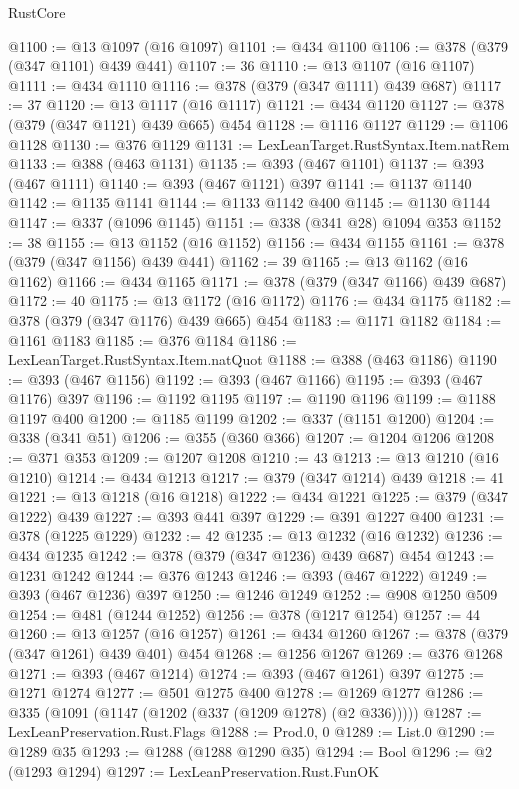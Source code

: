 \begin{lexlean}{RustCore}
\begin{coremodule}
@1100 := @13 @1097 (@16 @1097)
@1101 := @434 @1100
@1106 := @378 (@379 (@347 @1101) @439 @441)
@1107 := 36
@1110 := @13 @1107 (@16 @1107)
@1111 := @434 @1110
@1116 := @378 (@379 (@347 @1111) @439 @687)
@1117 := 37
@1120 := @13 @1117 (@16 @1117)
@1121 := @434 @1120
@1127 := @378 (@379 (@347 @1121) @439 @665) @454
@1128 := @1116 @1127
@1129 := @1106 @1128
@1130 := @376 @1129
@1131 := LexLeanTarget.RustSyntax.Item.natRem
@1133 := @388 (@463 @1131)
@1135 := @393 (@467 @1101)
@1137 := @393 (@467 @1111)
@1140 := @393 (@467 @1121) @397
@1141 := @1137 @1140
@1142 := @1135 @1141
@1144 := @1133 @1142 @400
@1145 := @1130 @1144
@1147 := @337 (@1096 @1145)
@1151 := @338 (@341 @28) @1094 @353
@1152 := 38
@1155 := @13 @1152 (@16 @1152)
@1156 := @434 @1155
@1161 := @378 (@379 (@347 @1156) @439 @441)
@1162 := 39
@1165 := @13 @1162 (@16 @1162)
@1166 := @434 @1165
@1171 := @378 (@379 (@347 @1166) @439 @687)
@1172 := 40
@1175 := @13 @1172 (@16 @1172)
@1176 := @434 @1175
@1182 := @378 (@379 (@347 @1176) @439 @665) @454
@1183 := @1171 @1182
@1184 := @1161 @1183
@1185 := @376 @1184
@1186 := LexLeanTarget.RustSyntax.Item.natQuot
@1188 := @388 (@463 @1186)
@1190 := @393 (@467 @1156)
@1192 := @393 (@467 @1166)
@1195 := @393 (@467 @1176) @397
@1196 := @1192 @1195
@1197 := @1190 @1196
@1199 := @1188 @1197 @400
@1200 := @1185 @1199
@1202 := @337 (@1151 @1200)
@1204 := @338 (@341 @51)
@1206 := @355 (@360 @366)
@1207 := @1204 @1206
@1208 := @371 @353
@1209 := @1207 @1208
@1210 := 43
@1213 := @13 @1210 (@16 @1210)
@1214 := @434 @1213
@1217 := @379 (@347 @1214) @439
@1218 := 41
@1221 := @13 @1218 (@16 @1218)
@1222 := @434 @1221
@1225 := @379 (@347 @1222) @439
@1227 := @393 @441 @397
@1229 := @391 @1227 @400
@1231 := @378 (@1225 @1229)
@1232 := 42
@1235 := @13 @1232 (@16 @1232)
@1236 := @434 @1235
@1242 := @378 (@379 (@347 @1236) @439 @687) @454
@1243 := @1231 @1242
@1244 := @376 @1243
@1246 := @393 (@467 @1222)
@1249 := @393 (@467 @1236) @397
@1250 := @1246 @1249
@1252 := @908 @1250 @509
@1254 := @481 (@1244 @1252)
@1256 := @378 (@1217 @1254)
@1257 := 44
@1260 := @13 @1257 (@16 @1257)
@1261 := @434 @1260
@1267 := @378 (@379 (@347 @1261) @439 @401) @454
@1268 := @1256 @1267
@1269 := @376 @1268
@1271 := @393 (@467 @1214)
@1274 := @393 (@467 @1261) @397
@1275 := @1271 @1274
@1277 := @501 @1275 @400
@1278 := @1269 @1277
@1286 := @335 (@1091 (@1147 (@1202 (@337 (@1209 @1278) (@2 @336)))))
@1287 := LexLeanPreservation.Rust.Flags
@1288 := Prod.{0, 0}
@1289 := List.{0}
@1290 := @1289 @35
@1293 := @1288 (@1288 @1290 @35)
@1294 := Bool
@1296 := @2 (@1293 @1294)
@1297 := LexLeanPreservation.Rust.FunOK

\end{coremodule}
\end{lexlean}
